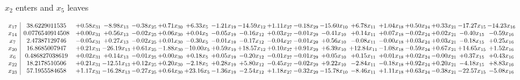 \documentclass[9pt]{article}
\begin{document}
 $ x_{2} $ enters and $ x_{5} $ leaves 

 \[\begin{array}{c| c c@{\hskip 2pt} c@{\hskip 2pt} c@{\hskip 2pt} c@{\hskip 2pt} c@{\hskip 2pt} c@{\hskip 2pt} c@{\hskip 2pt} c@{\hskip 2pt} c@{\hskip 2pt} c@{\hskip 2pt} c@{\hskip 2pt} c@{\hskip 2pt} c@{\hskip 2pt} c@{\hskip 2pt} c@{\hskip 2pt} c@{\hskip 2pt} }
 x_{17}   &  38.6229011535 & +  0.58 x_{31} & -8.98 x_{13} & -0.38 x_{25} & +  0.71 x_{30} & +  6.33 x_{5} & -1.21 x_{19} & -14.59 x_{12} & +  1.11 x_{27} & -0.18 x_{29} & -15.60 x_{10} & +  6.78 x_{11} & +  1.04 x_{18} & +  0.50 x_{24} & +  0.33 x_{21} & -17.27 x_{15} & -14.23 x_{16}\\
 x_{14}   &  0.0776540914508 & +  0.00 x_{31} & +  0.56 x_{13} & -0.02 x_{25} & +  0.06 x_{30} & +  0.04 x_{5} & -0.05 x_{19} & -0.16 x_{12} & +  0.03 x_{27} & -0.01 x_{29} & -0.41 x_{10} & +  0.14 x_{11} & +  0.07 x_{18} & -0.02 x_{24} & +  0.02 x_{21} & -0.40 x_{15} & -0.59 x_{16}\\
 x_{7}   &  2.47387129746 & -0.05 x_{31} & +  0.27 x_{13} & -0.02 x_{25} & +  0.01 x_{30} & -0.30 x_{5} & -0.01 x_{19} & -0.17 x_{12} & -0.04 x_{27} & -0.01 x_{29} & +  0.56 x_{10} & -0.08 x_{11} & -0.00 x_{18} & +  0.03 x_{24} & +  0.03 x_{21} & -0.18 x_{15} & +  0.25 x_{16}\\
 x_{20}   &  16.8685007947 & +  0.21 x_{31} & -26.19 x_{13} & +  0.61 x_{25} & -1.88 x_{30} & -10.00 x_{5} & +  0.59 x_{19} & + 18.57 x_{12} & +  0.10 x_{27} & +  0.91 x_{29} & +  6.39 x_{10} & + 12.84 x_{11} & -1.08 x_{18} & -0.59 x_{24} & +  0.67 x_{21} & + 14.65 x_{15} & +  1.52 x_{16}\\
 x_{6}   &  0.486827038619 & +  0.02 x_{31} & +  0.14 x_{13} & -0.01 x_{25} & +  0.00 x_{30} & +  0.18 x_{5} & +  0.05 x_{19} & -0.20 x_{12} & -0.01 x_{27} & -0.01 x_{29} & +  0.05 x_{10} & +  0.15 x_{11} & +  0.01 x_{18} & +  0.02 x_{24} & -0.00 x_{21} & +  0.37 x_{15} & +  0.43 x_{16}\\
 x_{22}   &  18.2178510506 & +  0.21 x_{31} & -12.51 x_{13} & +  0.12 x_{25} & +  0.20 x_{30} & -2.18 x_{5} & +  0.28 x_{19} & +  5.80 x_{12} & -0.45 x_{27} & -0.02 x_{29} & +  9.22 x_{10} & -2.84 x_{11} & -0.18 x_{18} & +  0.92 x_{24} & +  0.20 x_{21} & -4.18 x_{15} & +  8.83 x_{16}\\
 x_{23}   &  57.1955584658 & +  1.17 x_{31} & -16.28 x_{13} & -0.27 x_{25} & +  0.64 x_{30} & + 23.16 x_{5} & -1.36 x_{19} & -2.54 x_{12} & +  1.18 x_{27} & -0.32 x_{29} & -15.78 x_{10} & -8.46 x_{11} & +  1.11 x_{18} & +  0.63 x_{24} & -0.38 x_{21} & -22.57 x_{15} & -5.08 x_{16}\\

\end{array}\]
\end{document}
